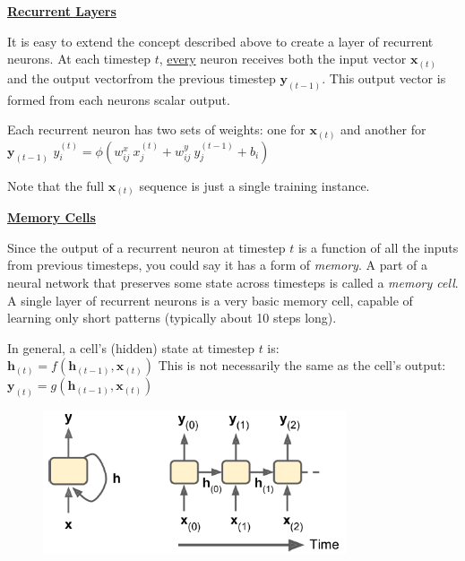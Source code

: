 \newpage
\textbf{\underline{Recurrent Layers}}

It is easy to extend the concept described above to create a layer of recurrent neurons.\newline
At each timestep $t$, \underline{every} neuron receives both the input vector $\boldsymbol{x}_{(t)}$
and the output vector\newline from the previous timestep $\boldsymbol{y}_{(t-1)}$.
This output vector is formed from each neurons scalar output.

Each recurrent neuron has two sets of weights: one for $\boldsymbol{x}_{(t)}$ and another for $\boldsymbol{y}_{(t-1)}$\newline
$y^{(t)}_i = \phi (w^x_{ij} \: x^{(t)}_j + w^y_{ij} \: y^{(t-1)}_j + b_i)$

Note that the full $\boldsymbol{x}_{(t)}$ sequence is just a single training instance.\newline

\textbf{\underline{Memory Cells}}

Since the output of a recurrent neuron at timestep $t$ is a function of all the inputs from previous timesteps,
you could say it has a form of \textit{memory}.
A part of a neural network that preserves some state across timesteps is called a \textit{memory cell}.
% 
A single layer of recurrent neurons is a very basic memory cell,
capable of learning only short patterns (typically about 10 steps long).

In general, a cell's (hidden) state at timestep $t$ is:~~~~~~~$\boldsymbol{h}_{(t)} = f(\boldsymbol{h}_{(t-1)}, \boldsymbol{x}_{(t)})$\newline
This is not necessarily the same as the cell's output:~~$\boldsymbol{y}_{(t)} = g(\boldsymbol{h}_{(t-1)}, \boldsymbol{x}_{(t)})$\newline

\begin{figure}[ht]
\centering
\includegraphics[width=0.80\textwidth]{./images/memory_cells.png}
\end{figure}

